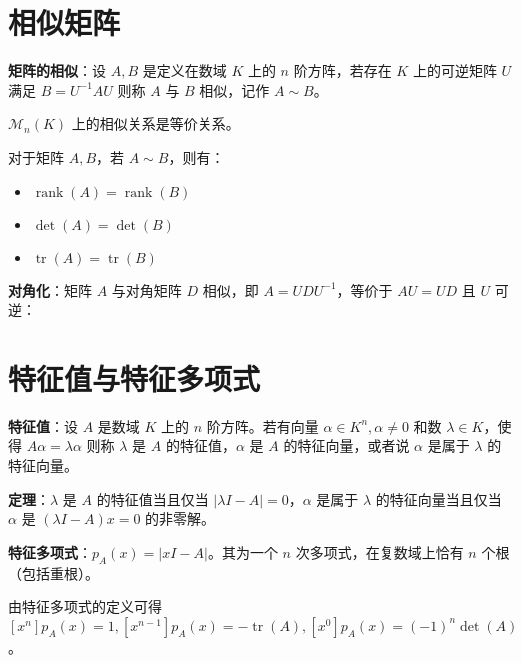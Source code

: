 \section{相似矩阵}

\begin{tcolorbox}
\textbf{矩阵的相似}：设 $A,B$ 是定义在数域 $K$ 上的 $n$ 阶方阵，若存在 $K$ 上的可逆矩阵 $U$ 满足 $B=U^{-1}AU$ 
            则称 $A$ 与 $B$ 相似，记作 $A\sim B$。
\end{tcolorbox}

$\mathcal{M}_n(K)$ 上的相似关系是等价关系。

对于矩阵 $A,B$，若 $A\sim B$，则有：

\begin{itemize}
    \item $\operatorname{rank}(A)=\operatorname{rank}(B)$
    \item $\det(A)=\det(B)$
    \item $\operatorname{tr}(A)=\operatorname{tr}(B)$
\end{itemize}

\begin{tcolorbox}
\textbf{对角化}：矩阵 $A$ 与对角矩阵 $D$ 相似，即 $A=UDU^{-1}$，等价于 $AU=UD$ 且 $U$ 可逆：
\end{tcolorbox}

\section{特征值与特征多项式}

\begin{tcolorbox}
\textbf{特征值}：设 $A$ 是数域 $K$ 上的 $n$ 阶方阵。若有向量 $\alpha \in K^n,\alpha\ne 0$ 和数 $\lambda\in K$，使得 $A\alpha=\lambda\alpha$ 则称 $\lambda$ 是 $A$ 的特征值，$\alpha$ 是 $A$ 的特征向量，或者说 $\alpha$ 是属于 $\lambda$ 的特征向量。
\end{tcolorbox}

\begin{tcolorbox}
\textbf{定理}：$\lambda$ 是 $A$ 的特征值当且仅当 $|\lambda I-A|=0$，$\alpha$ 是属于 $\lambda$ 的特征向量当且仅当 $\alpha$ 是 $(\lambda I-A)x=0$ 的非零解。
\end{tcolorbox}

\begin{tcolorbox}
\textbf{特征多项式}：$p_A(x)=|xI-A|$。其为一个 $n$ 次多项式，在复数域上恰有 $n$ 个根（包括重根）。
\end{tcolorbox}

由特征多项式的定义可得 $[x^n]p_A(x)=1,[x^{n-1}]p_A(x)=-\operatorname{tr}(A),[x^0]p_A(x)=(-1)^n\det(A)$。


